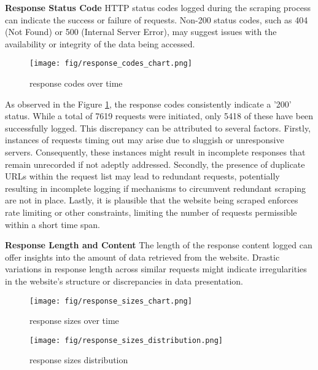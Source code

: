 \documentclass[12pt]{article} %
\begin{document}
{        \textbf{Response Status Code}
        HTTP status codes logged during the scraping process can indicate the success or failure of requests. Non-200 status codes, such as 404 (Not Found) or 500 (Internal Server Error), may suggest issues with the availability or integrity of the data being accessed.


        \begin{figure}[]
            \centering
            \texttt{[image: fig/response\_codes\_chart.png]}
            \caption{response codes over time}
            \label{fig:response_codes}
        \end{figure}

        As observed in the Figure \ref{fig:response_codes}, the response codes consistently indicate a '200' status. While a total of 7619 requests were initiated, only 5418 of these have been successfully logged. This discrepancy can be attributed to several factors. Firstly, instances of requests timing out may arise due to sluggish or unresponsive servers. Consequently, these instances might result in incomplete responses that remain unrecorded if not adeptly addressed. Secondly, the presence of duplicate URLs within the request list may lead to redundant requests, potentially resulting in incomplete logging if mechanisms to circumvent redundant scraping are not in place. Lastly, it is plausible that the website being scraped enforces rate limiting or other constraints, limiting the number of requests permissible within a short time span.

        \textbf{Response Length and Content}
        The length of the response content logged can offer insights into the amount of data retrieved from the website. Drastic variations in response length across similar requests might indicate irregularities in the website's structure or discrepancies in data presentation.

        \begin{figure}[]
            \centering
            \texttt{[image: fig/response\_sizes\_chart.png]}
            \caption{response sizes over time}
            \label{fig:response_sizes}
        \end{figure}

        \begin{figure}[]
            \centering
            \texttt{[image: fig/response\_sizes\_distribution.png]}
            \caption{response sizes distribution}
            \label{fig:res_size_distr}
        \end{figure}


}
\end{document}
